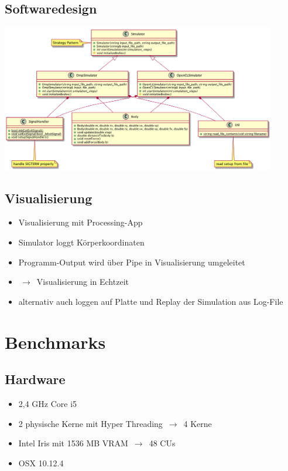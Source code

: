 \documentclass{beamer}
\begin{document}
\subsection{Softwaredesign}
\begin{frame}
\includegraphics[width=12cm]{img/classes.png}
\end{frame}

\subsection{Visualisierung}
\begin{frame}
\begin{itemize}
  \item Visualisierung mit Processing-App
  \item Simulator loggt Körperkoordinaten
  \item Programm-Output wird über Pipe in Visualisierung umgeleitet
  \item $\,\to\,$ Visualisierung in Echtzeit
  \item alternativ auch loggen auf Platte und Replay der Simulation aus Log-File
\end{itemize}
\end{frame}

\section{Benchmarks}
\subsection{Hardware}
\begin{frame}
\begin{itemize}
  \item 2,4 GHz Core i5
  \item 2 physische Kerne mit Hyper Threading $\,\to\,$ 4 Kerne
  \item Intel Iris mit 1536 MB VRAM $\,\to\,$ 48 CUs
  \item OSX 10.12.4
\end{itemize}
\end{frame}
\end{document}
